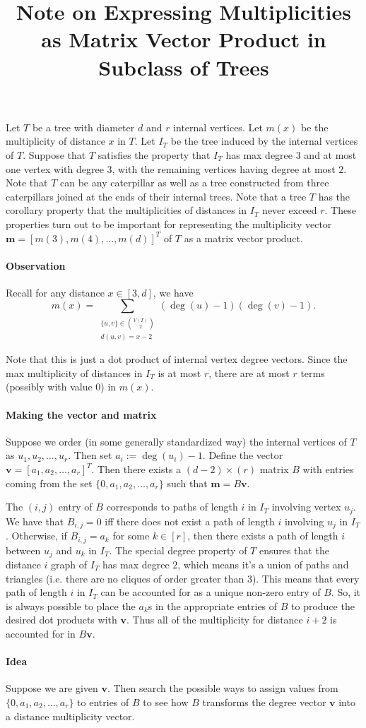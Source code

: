 \documentclass[12]{article}
\title{ \vspace{-3cm} Note on Expressing Multiplicities as Matrix Vector Product in Subclass of Trees }
\theoremstyle{definition}
\begin{document}
	\maketitle
	Let $T$ be a tree with diameter $d$ and $r$ internal vertices.  Let $m(x)$ be the multiplicity of distance $x$ in $T$.  Let $I_T$ be the tree induced by the internal vertices of $T$.  Suppose that $T$ satisfies the property that $I_T$ has max degree $3$ and at most one vertex with degree $3$, with the remaining vertices having degree at most $2$.  Note that $T$ can be any caterpillar as well as a tree constructed from three caterpillars joined at the ends of their internal trees.  Note that a tree $T$ has the corollary property that the multiplicities of distances in $I_T$ never exceed $r$.  These properties turn out to be important for representing the multiplicity vector $\mathbf{m} = [m(3), m(4), \ldots, m(d)]^T$ of $T$ as a matrix vector product.
	
	\paragraph{Observation}
		  Recall for any distance $x \in [3,d]$, we have
		$$m(x) = \sum_{\substack{\{u,v\} \in {V(T) \choose 2} \\ d(u,v) = x-2}} (\deg(u)-1) (\deg(v)-1).$$
		
		Note that this is just a dot product of internal vertex degree vectors.  Since the max multiplicity of distances in $I_T$ is at most $r$, there are at most $r$ terms (possibly with value $0$) in $m(x)$.
		
	\paragraph{Making the vector and matrix}
	
		Suppose we order (in some generally standardized way) the internal vertices of $T$ as $u_1, u_2, \ldots, u_r$.  Then set $a_i := \deg(u_i)-1$.  Define the vector $\mathbf{v} = [a_1, a_2, \ldots, a_r]^T$.  Then there exists a $(d-2) \times (r)$ matrix $B$ with entries coming from the set $\{0, a_1, a_2, \ldots, a_r\}$ such that $\mathbf{m} = B\mathbf{v}$.
		
		The $(i,j)$ entry of $B$ corresponds to paths of length $i$ in $I_T$ involving vertex $u_j$.  We have that $B_{i,j} = 0$ iff there does not exist a path of length $i$ involving $u_j$ in $I_T$.  Otherwise, if $B_{i,j} = a_k$ for some $k \in [r]$, then there exists a path of length $i$ between $u_j$ and $u_k$ in $I_T$.  The special degree property of $T$ ensures that the distance $i$ graph of $I_T$ has max degree $2$, which means it's a union of paths and triangles (i.e. there are no cliques of order greater than $3$).  This means that every path of length $i$ in $I_T$ can be accounted for as a unique non-zero entry of $B$.  So, it is always possible to place the $a_k$s in the appropriate entries of $B$ to produce the desired dot products with $\mathbf{v}$.  Thus all of the multiplicity for distance $i+2$ is accounted for in $B\mathbf{v}$.
		
	\paragraph{Idea}
	Suppose we are given $\mathbf{v}$.  Then search the possible ways to assign values from $\{0, a_1, a_2, \ldots, a_r\}$ to entries of $B$ to see how $B$ transforms the degree vector $\mathbf{v}$ into a distance multiplicity vector. 
\end{document}
